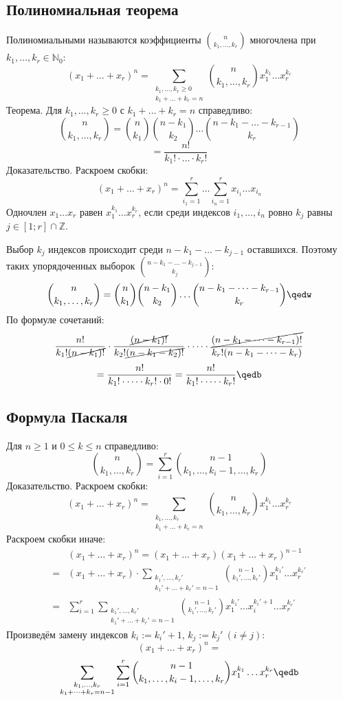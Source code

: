 \subsection{Полиномиальная теорема}

{\ital Полиномиальными} называются коэффициенты $\binom{n}{k_1,\dots,k_r}$ многочлена при $k_1,\dots,k_r\in\mathbb{N}_0$:
$$(x_1+\dots+x_r)^n=\sum_{\substack{k_1,\dots,k_r\geq 0\\k_1+\dots+k_r=n}}\binom{n}{k_1,\dots,k_r}x_1^{k_1}\dots x_r^{k_r}$$
{\bold Теорема.} Для $k_1,\dots,k_r\geq 0$ с $k_1+\dots+k_r=n$ справедливо:
$$\binom{n}{k_1,\dots,k_r}=\binom{n}{k_1}\binom{n-k_1}{k_2}\dots\binom{n-k_1-\dots-k_{r-1}}{k_r}$$
$$=\frac{n!}{k_1!\cdot\dots\cdot k_r!}$$
{\bold Доказательство.} Раскроем скобки:
$$(x_1+\dots+x_r)^n=\sum_{i_1=1}^r\dots\sum_{i_n=1}^rx_{i_1}\dots x_{i_n}$$
Одночлен $x_1\dots x_r$ равен $x_1^{k_1}\dots x_r^{k_r}$, если среди индексов $i_1,\dots,i_n$ ровно $k_j$ равны $j\in[1;r]\cap\mathbb{Z}$.

Выбор $k_j$ индексов происходит среди $n-k_1-\dots-k_{j-1}$ оставшихся. Поэтому таких упорядоченных выборок $\binom{n-k_1-\dots-k_{j-1}}{k_j}$:
$$\binom{n}{k_1,\dots,k_r}=\binom{n}{k_1}\binom{n-k_1}{k_2}\dots\binom{n-k_1-\dots-k_{r-1}}{k_r}\qedw$$
По формуле сочетаний:
$$\frac{n!}{k_1!\cancel{(n-k_1)!}}\cdot\frac{\cancel{(n-k_1)!}}{k_2!\cancel{(n-k_1-k_2)!}}\cdot\dots\cdot\frac{\cancel{(n-k_1-\dots-k_{r-1})!}}{k_r!(n-k_1-\dots-k_r)}$$
$$=\frac{n!}{k_1!\cdot\dots\cdot k_r!\cdot 0!}=\frac{n!}{k_1!\cdot\dots\cdot k_r!}\qedb$$

\subsection{Формула Паскаля}

Для $n\geq 1$ и $0\leq k\leq n$ справедливо:
$$\binom{n}{k_1,\dots,k_r}=\sum_{i=1}^r\binom{n-1}{k_1,\dots,k_i-1,\dots,k_r}$$
{\bold Доказательство.} Раскроем скобки:
$$(x_1+\dots+x_r)^n=\sum_{\substack{k_1,\dots,k_r\\k_1+\dots+k_r=n}}\binom{n}{k_1,\dots,k_r}x_1^{k_1}\dots x_r^{k_r}$$
Раскроем скобки иначе:
\begin{align*}
&(x_1+\dots+x_r)^n=(x_1+\dots+x_r)(x_1+\dots+x_r)^{n-1}\\
=&(x_1+\dots+x_r)\cdot\sum_{\substack{k_1',\dots,k_r'\\k_1'+\dots+k_r'=n-1}}\binom{n-1}{k_1',\dots,k_r'}x_1^{k_1'}\dots x_r^{k_r'}\\
=&\sum_{i=1}^r\sum_{\substack{k_1',\dots,k_r'\\k_1'+\dots+k_r'=n-1}}\binom{n-1}{k_1',\dots,k_r'}x_1^{k_1'}\dots x_i^{k_i'+1}\dots x_r^{k_r'}
\end{align*}
Произведём замену индексов $k_i:=k_i'+1$, $k_j:=k_j'\ (i\neq j)$:
$$(x_1+\dots+x_r)^n=$$
$$\sum_{\substack{k_1,\dots,k_r\\k_1+\dots+k_r=n-1}}\sum_{i=1}^r\binom{n-1}{k_1,\dots,k_i-1,\dots,k_r}x_1^{k_1}\dots x_r^{k_r}\qedb$$

